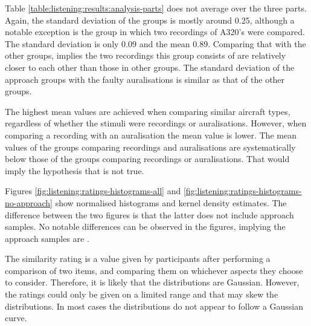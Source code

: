 Table \ref{table:listening:results:analysis-parts} does not average over the
three parts. Again, the standard deviation of the groups is mostly around 0.25,
although a notable exception is the group in which two recordings of A320's were
compared. The standard deviation is only 0.09 and the mean 0.89. Comparing that
with the other groups, implies the two recordings this group consists of are
relatively closer to each other than those in other groups. The standard
deviation of the approach groups with the faulty auralisations is similar as
that of the other groups.

The highest mean values are achieved when comparing similar aircraft types,
regardless of whether the stimuli were recordings or auralisations. However,
when comparing a recording with an auralisation the mean value is lower. The
mean values of the groups comparing recordings and auralisations are
systematically below those of the groups comparing recordings or auralisations.
That would imply the hypothesis that  is not true.

Figures \ref{fig:listening:ratings-histograms-all} and
\ref{fig:listening:ratings-histograms-no-approach} show normalised histograms
and kernel density estimates. The difference between the two figures is that the
latter does not include approach samples. No notable differences can be observed
in the figures, implying the approach samples are .


The similarity rating is a value given by participants after performing a
comparison of two items, and comparing them on whichever aspects they choose to
consider. Therefore, it is likely that the distributions are Gaussian. However,
the ratings could only be given on a limited range and that may skew the
distributions. In most cases the distributions do not appear to follow a Gaussian curve.




